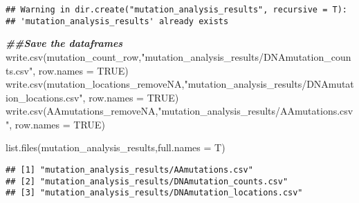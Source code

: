 \documentclass[
]{article}
\newenvironment{Shaded}{\begin{snugshade}}{\end{snugshade}}
\newcommand{\AttributeTok}[1]{\textcolor[rgb]{0.77,0.63,0.00}{#1}}
\newcommand{\ConstantTok}[1]{\textcolor[rgb]{0.00,0.00,0.00}{#1}}
\newcommand{\DocumentationTok}[1]{\textcolor[rgb]{0.56,0.35,0.01}{\textbf{\textit{#1}}}}
\newcommand{\FunctionTok}[1]{\textcolor[rgb]{0.00,0.00,0.00}{#1}}
\newcommand{\NormalTok}[1]{#1}
\newcommand{\StringTok}[1]{\textcolor[rgb]{0.31,0.60,0.02}{#1}}
\begin{document}
\begin{verbatim}
## Warning in dir.create("mutation_analysis_results", recursive = T):
## 'mutation_analysis_results' already exists
\end{verbatim}

\begin{Shaded}
\begin{Highlighting}[]
\DocumentationTok{\#\#Save the dataframes }
\FunctionTok{write.csv}\NormalTok{(mutation\_count\_row,}\StringTok{"mutation\_analysis\_results/DNAmutation\_counts.csv"}\NormalTok{, }\AttributeTok{row.names =} \ConstantTok{TRUE}\NormalTok{)}
\FunctionTok{write.csv}\NormalTok{(mutation\_locations\_removeNA,}\StringTok{"mutation\_analysis\_results/DNAmutation\_locations.csv"}\NormalTok{, }\AttributeTok{row.names =} \ConstantTok{TRUE}\NormalTok{)}
\FunctionTok{write.csv}\NormalTok{(AAmutations\_removeNA,}\StringTok{"mutation\_analysis\_results/AAmutations.csv"}\NormalTok{, }\AttributeTok{row.names =} \ConstantTok{TRUE}\NormalTok{)}

\FunctionTok{list.files}\NormalTok{(}\StringTok{\textquotesingle{}mutation\_analysis\_results\textquotesingle{}}\NormalTok{,}\AttributeTok{full.names =}\NormalTok{ T)}
\end{Highlighting}
\end{Shaded}

\begin{verbatim}
## [1] "mutation_analysis_results/AAmutations.csv"          
## [2] "mutation_analysis_results/DNAmutation_counts.csv"   
## [3] "mutation_analysis_results/DNAmutation_locations.csv"
\end{verbatim}
\end{document}
